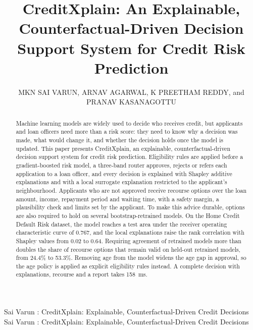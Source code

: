 \documentclass{ieeeaccess}
\begin{document}

\title{CreditXplain: An Explainable, Counterfactual-Driven Decision Support System for Credit Risk Prediction}

\author{\uppercase{MKN Sai Varun},
\uppercase{Arnav Agarwal},
\uppercase{K Preetham Reddy}, and
\uppercase{Pranav Kasanagottu}}
\address[1]{Department of Computer Science and Engineering, Keshav Memorial Institute of Technology,
Hyderabad, Telangana, India (e-mail: FILL IN)}


\markboth
{Sai Varun \headeretal: CreditXplain: Explainable, Counterfactual-Driven Credit Decisions}
{Sai Varun \headeretal: CreditXplain: Explainable, Counterfactual-Driven Credit Decisions}


\begin{abstract}
Machine learning models are widely used to decide who receives credit, but applicants and loan officers need more than a risk score: they need to know why a decision was made, what would change it, and whether the decision holds once the model is updated. This paper presents CreditXplain, an explainable, counterfactual-driven decision support system for credit risk prediction. Eligibility rules are applied before a gradient-boosted risk model, a three-band router approves, rejects or refers each application to a loan officer, and every decision is explained with Shapley additive explanations and with a local surrogate explanation restricted to the applicant's neighbourhood. Applicants who are not approved receive recourse options over the loan amount, income, repayment period and waiting time, with a safety margin, a plausibility check and limits set by the applicant. To make this advice durable, options are also required to hold on several bootstrap-retrained models. On the Home Credit Default Risk dataset, the model reaches a test area under the receiver operating characteristic curve of 0.767, and the local explanations raise the rank correlation with Shapley values from 0.02 to 0.64. Requiring agreement of retrained models more than doubles the share of recourse options that remain valid on held-out retrained models, from 24.4\% to 53.3\%. Removing age from the model widens the age gap in approval, so the age policy is applied as explicit eligibility rules instead. A complete decision with explanations, recourse and a report takes 158~ms.
\end{abstract}
\end{document}
